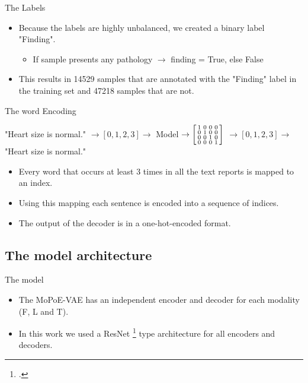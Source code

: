     \begin{frame}{The Labels}
    \pause
    \begin{itemize}
        \item Because the labels are highly unbalanced, we created a binary label "Finding".
        \begin{itemize}
            \item If sample presents any pathology $\rightarrow$ finding = True, else False
        \end{itemize}
        \item This results in 14529 samples that are annotated with the "Finding" label in the training set and 47218 samples that are not.
    \end{itemize}
    \end{frame}

    \begin{frame}{The word Encoding}

        \small{
        "Heart size is normal." $\rightarrow [0,1,2,3] \rightarrow$ Model $\rightarrow
        \begin{bsmallmatrix}
            1 & 0 & 0 & 0\\
            0 & 1 & 0 & 0\\
            0 & 0 & 1 & 0\\
            0 & 0 & 0 & 1\\
        \end{bsmallmatrix}$
        $\rightarrow [0,1,2,3] \rightarrow$ "Heart size is normal."}\\
        \vspace{\baselineskip}
        \pause
        \begin{itemize}
            \item Every word that occurs at least 3 times in all the text reports is mapped to an index.
            \pause
            \item Using this mapping each sentence is encoded into a sequence of indices.
            \pause
            \item The output of the decoder is in a one-hot-encoded format.
        \end{itemize}
    \end{frame}

    \subsection{The model architecture}
    \begin{frame}{The model}
        \begin{itemize}
            \item The MoPoE-VAE has an independent encoder and decoder for each modality (F, L and T).
            \item In this work we used a ResNet \footcite{he2016deep} type architecture for all encoders and decoders.
        \end{itemize}

    \end{frame}

